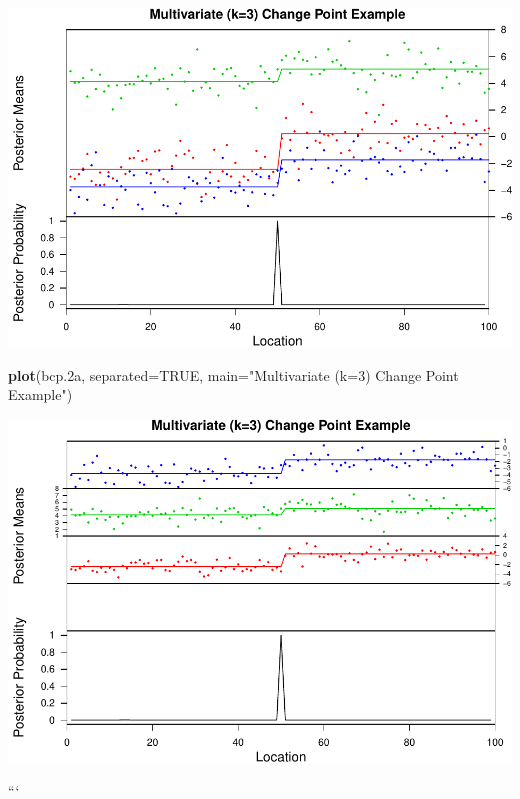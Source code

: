 \documentclass[]{article}
\newenvironment{Shaded}{\begin{snugshade}}{\end{snugshade}}
\newcommand{\KeywordTok}[1]{\textcolor[rgb]{0.13,0.29,0.53}{\textbf{{#1}}}}
\newcommand{\DataTypeTok}[1]{\textcolor[rgb]{0.13,0.29,0.53}{{#1}}}
\newcommand{\StringTok}[1]{\textcolor[rgb]{0.31,0.60,0.02}{{#1}}}
\newcommand{\OtherTok}[1]{\textcolor[rgb]{0.56,0.35,0.01}{{#1}}}
\newcommand{\NormalTok}[1]{{#1}}
\begin{document}
\includegraphics{rentersAndOwners_files/figure-latex/unnamed-chunk-7-1.pdf}

\begin{Shaded}
\begin{Highlighting}[]
\KeywordTok{plot}\NormalTok{(bcp.2a, }\DataTypeTok{separated=}\OtherTok{TRUE}\NormalTok{, }\DataTypeTok{main=}\StringTok{"Multivariate (k=3) Change Point Example"}\NormalTok{)}
\end{Highlighting}
\end{Shaded}

\includegraphics{rentersAndOwners_files/figure-latex/unnamed-chunk-7-2.pdf}

```
\end{document}
